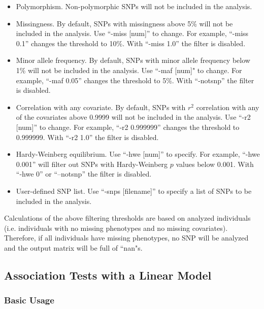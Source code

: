\documentclass[11pt]{article}
\begin{document}
\begin{itemize}

\item Polymorphism. Non-polymorphic SNPs will not be included in the
  analysis.

\item Missingness. By default, SNPs with missingness above 5\% will
  not be included in the analysis. Use ``-miss [num]'' to change. For
  example, ``-miss 0.1'' changes the threshold to 10\%. With
  ``-miss 1.0'' the filter is disabled.

\item Minor allele frequency. By default, SNPs with minor allele
  frequency below 1\% will not be included in the analysis. Use ``-maf
  [num]" to change. For example, ``-maf 0.05'' changes the threshold
  to 5\%. With ``-notsnp'' the filter is disabled.

\item Correlation with any covariate. By default, SNPs with $r^2$
  correlation with any of the covariates above 0.9999 will not be
  included in the analysis. Use ``-r2 [num]'' to change. For example,
  ``-r2 0.999999'' changes the threshold to 0.999999.  With ``-r2
  1.0'' the filter is disabled.

\item Hardy-Weinberg equilibrium. Use ``-hwe [num]'' to specify. For
  example, ``-hwe 0.001'' will filter out SNPs with Hardy-Weinberg $p$
  values below 0.001.  With ``-hwe 0'' or ``--notsnp'' the filter is
  disabled.

\item User-defined SNP list. Use ``-snps [filename]'' to specify a
  list of SNPs to be included in the analysis.

\end{itemize}

Calculations of the above filtering thresholds are based on analyzed
individuals (i.e. individuals with no missing phenotypes and no
missing covariates). Therefore, if all individuals have missing
phenotypes, no SNP will be analyzed and the output matrix will be full
of ``nan"s.

\subsection{Association Tests with a Linear Model}

\subsubsection{Basic Usage}
\end{document}
